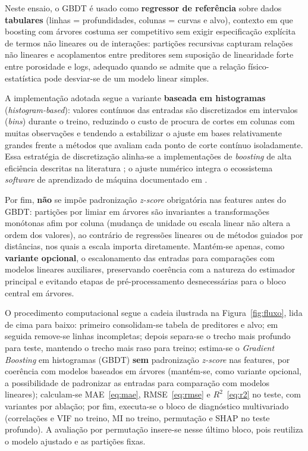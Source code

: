 \documentclass[12pt,a4paper]{article}
\begin{document}
Neste ensaio, o GBDT é usado como \textbf{regressor de referência} sobre dados
\textbf{tabulares} (linhas = profundidades, colunas = curvas e alvo), contexto em
que boosting com árvores costuma ser competitivo sem exigir especificação explícita
de termos não lineares ou de interações: partições recursivas capturam relações não
lineares e acoplamentos entre preditores sem suposição de linearidade forte entre
porosidade e logs, adequado quando se admite que a relação físico-estatística pode
desviar-se de um modelo linear simples.

A implementação adotada segue a variante \textbf{baseada em histogramas}
(\textit{histogram-based}): valores contínuos das entradas são discretizados em
intervalos (\textit{bins}) durante o treino, reduzindo o custo de procura de cortes
em colunas com muitas observações e tendendo a estabilizar o ajuste em bases
relativamente grandes frente a métodos que avaliam cada ponto de corte contínuo
isoladamente. Essa estratégia de discretização alinha-se a implementações de
\textit{boosting} de alta eficiência descritas na literatura \citep{ke2017lightgbm};
o ajuste numérico integra o ecossistema \textit{software} de aprendizado de máquina
documentado em \citep{pedregosa2011scikit}.

Por fim, \textbf{não} se impõe padronização \textit{z-score} obrigatória nas features
antes do GBDT: partições por limiar em árvores são invariantes a transformações
monótonas afim por coluna (mudança de unidade ou escala linear não altera a ordem
dos valores), ao contrário de regressões lineares ou de métodos guiados por
distâncias, nos quais a escala importa diretamente. Mantém-se apenas, como
\textbf{variante opcional}, o escalonamento das entradas para comparações com
modelos lineares auxiliares, preservando coerência com a natureza do estimador
principal e evitando etapas de pré-processamento desnecessárias para o bloco central
em árvores.

O procedimento computacional segue a cadeia ilustrada na Figura~\ref{fig:fluxo}, lida
de cima para baixo: primeiro consolidam-se tabela de preditores e alvo; em seguida
remove-se linhas incompletas; depois separa-se o trecho mais profundo para teste,
mantendo o trecho mais raso para treino; estima-se o \textit{Gradient Boosting}
em histogramas (GBDT) \textbf{sem} padronização \textit{z-score} nas features,
por coerência com modelos baseados em árvores (mantém-se, como variante opcional,
a possibilidade de padronizar as entradas para comparação com modelos lineares); calculam-se
MAE~\eqref{eq:mae}, RMSE~\eqref{eq:rmse} e \(R^2\)~\eqref{eq:r2} no teste, com variantes
por ablação;
por fim, executa-se o bloco de diagnóstico multivariado (correlações e VIF no treino,
MI no treino, permutação e SHAP no teste profundo). A avaliação por
permutação insere-se nesse último bloco, pois reutiliza o modelo ajustado e
as partições fixas.
\end{document}
